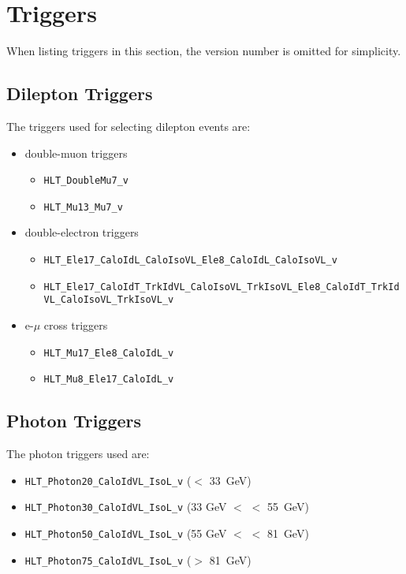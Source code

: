 \section{Triggers}

When listing triggers in this section, the version number is omitted for simplicity.

\subsection{Dilepton Triggers}
\label{app:trigsel}

The triggers used for selecting dilepton events are:

\begin{itemize}
\item double-muon triggers
  \begin{itemize}
  \item \verb=HLT_DoubleMu7_v=
  \item \verb=HLT_Mu13_Mu7_v=
  \end{itemize}
\item double-electron triggers
  \begin{itemize}
  \item \verb=HLT_Ele17_CaloIdL_CaloIsoVL_Ele8_CaloIdL_CaloIsoVL_v=
  \item \verb=HLT_Ele17_CaloIdT_TrkIdVL_CaloIsoVL_TrkIsoVL_Ele8_CaloIdT_TrkIdVL_CaloIsoVL_TrkIsoVL_v=
  \end{itemize}
\item e-$\mu$ cross triggers
  \begin{itemize}
  \item \verb=HLT_Mu17_Ele8_CaloIdL_v=
  \item \verb=HLT_Mu8_Ele17_CaloIdL_v=
  \end{itemize}
\end{itemize}


\subsection{Photon Triggers}
\label{app:photrig}

The photon triggers used are:

\begin{itemize}
\item \verb=HLT_Photon20_CaloIdVL_IsoL_v= (\Z \pt $<$ 33~GeV)
\item \verb=HLT_Photon30_CaloIdVL_IsoL_v= (33 GeV $<$ \Z \pt $<$ 55~GeV)
\item \verb=HLT_Photon50_CaloIdVL_IsoL_v= (55 GeV $<$ \Z \pt $<$ 81~GeV)
\item \verb=HLT_Photon75_CaloIdVL_IsoL_v= (\Z \pt $>$ 81~GeV)
\end{itemize}

